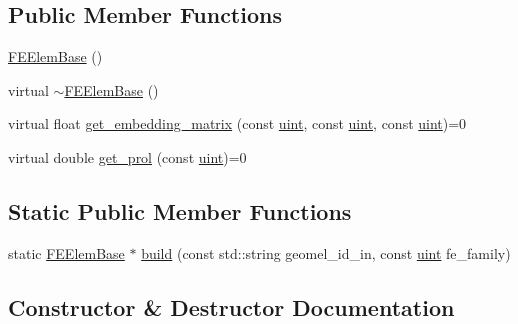 \subsection*{Public Member Functions}
\begin{DoxyCompactItemize}
\item 
\mbox{\hyperlink{classfemus_1_1_f_e_elem_base_a8b85fcc566f310e7fd7477538c117a53}{F\+E\+Elem\+Base}} ()
\item 
virtual \mbox{\hyperlink{classfemus_1_1_f_e_elem_base_a4aca64e8a81acb283c738ca123841ed3}{$\sim$\+F\+E\+Elem\+Base}} ()
\item 
virtual float \mbox{\hyperlink{classfemus_1_1_f_e_elem_base_a0c4d6d5ec66bd4e301eb8ea2ef10f354}{get\+\_\+embedding\+\_\+matrix}} (const \mbox{\hyperlink{_typedefs_8hpp_a91ad9478d81a7aaf2593e8d9c3d06a14}{uint}}, const \mbox{\hyperlink{_typedefs_8hpp_a91ad9478d81a7aaf2593e8d9c3d06a14}{uint}}, const \mbox{\hyperlink{_typedefs_8hpp_a91ad9478d81a7aaf2593e8d9c3d06a14}{uint}})=0
\item 
virtual double \mbox{\hyperlink{classfemus_1_1_f_e_elem_base_ac82326cdc7cb02329c7be9547d56fad4}{get\+\_\+prol}} (const \mbox{\hyperlink{_typedefs_8hpp_a91ad9478d81a7aaf2593e8d9c3d06a14}{uint}})=0
\end{DoxyCompactItemize}
\subsection*{Static Public Member Functions}
\begin{DoxyCompactItemize}
\item 
static \mbox{\hyperlink{classfemus_1_1_f_e_elem_base}{F\+E\+Elem\+Base}} $\ast$ \mbox{\hyperlink{classfemus_1_1_f_e_elem_base_a012272423d14a7a4e399d26ca27cdcfc}{build}} (const std\+::string geomel\+\_\+id\+\_\+in, const \mbox{\hyperlink{_typedefs_8hpp_a91ad9478d81a7aaf2593e8d9c3d06a14}{uint}} fe\+\_\+family)
\end{DoxyCompactItemize}


\subsection{Constructor \& Destructor Documentation}
\mbox{\label{classfemus_1_1_f_e_elem_base_a8b85fcc566f310e7fd7477538c117a53}} 
